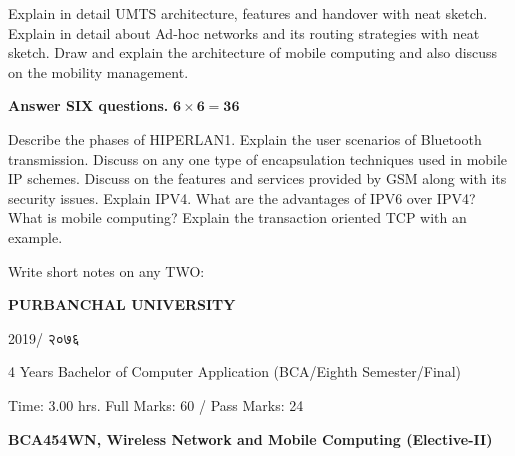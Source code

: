 \documentclass[a4paper, twoside, 12pt, noanswers]{exam}
\newcommand{\textnp}{\texthindi}
\begin{document}
\begin{questions}

	\question Explain in detail UMTS architecture, features and handover with neat sketch.
	\question Explain in detail about Ad-hoc networks and its routing strategies with neat sketch.
	\question Draw and explain the architecture of mobile computing and also discuss on the mobility management.

	{\par}
	{\hspace*{-0.5cm}\noindent\bfseries Answer SIX questions.} \hfill {\( \mathbf{6 \times 6 = 36}\)}

	\question Describe the phases of HIPERLAN1.
	\question Explain the user scenarios of Bluetooth transmission.
	\question Discuss on any one type of encapsulation techniques used in mobile IP schemes.
\question Discuss on the features and services provided by GSM along with its security issues.
\question Explain IPV4. What are the advantages of IPV6 over IPV4?
\question What is mobile computing? Explain the transaction oriented TCP with an example.

\question Write short notes on any TWO:

\end{questions}
\newpage



\begin{framed}
	\raggedright{\bfseries\Large\centering PURBANCHAL UNIVERSITY \par {2019/ \textnp{२०७६}}\par}
	{ 4 Years Bachelor of Computer Application (BCA/Eighth Semester/Final)\par}
	{ Time: 3.00 hrs.  \hfill Full Marks: 60 / Pass Marks: 24\par}
	{\bfseries {BCA454WN, Wireless Network and Mobile Computing (Elective-II) \hfill}\par}
\end{framed}
\end{document}
